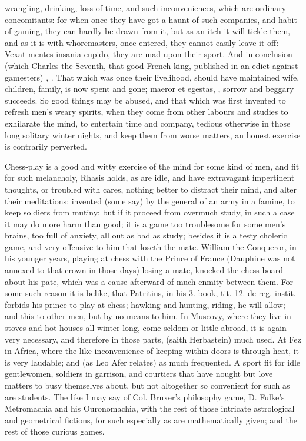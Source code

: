 {wrangling, drinking, loss of time, and such inconveniences, which are
ordinary concomitants: for when once they have got a haunt of
such companies, and habit of gaming, they can hardly be drawn from it,
but as an itch it will tickle them, and as it is with whoremasters,
once entered, they cannot easily leave it off: Vexat mentes insania
cupido, they are mad upon their sport. And in conclusion (which Charles
the Seventh, that good French king, published in an edict against
gamesters) , \etc{}. That which was once their livelihood, should have
maintained wife, children, family, is now spent and gone; maeror et
egestas, \etc{}, sorrow and beggary succeeds. So good things may be
abused, and that which was first invented to  refresh men's weary
spirits, when they come from other labours and studies to exhilarate
the mind, to entertain time and company, tedious otherwise in those
long solitary winter nights, and keep them from worse matters, an
honest exercise is contrarily perverted.

Chess-play is a good and witty exercise of the mind for some kind of
men, and fit for such melancholy, Rhasis holds, as are idle, and have
extravagant impertinent thoughts, or troubled with cares, nothing
better to distract their mind, and alter their meditations: invented
(some say) by the general of an army in a famine, to keep
soldiers from mutiny: but if it proceed from overmuch study, in such a
case it may do more harm than good; it is a game too troublesome for
some men's brains, too full of anxiety, all out as bad as study;
besides it is a testy choleric game, and very offensive to him that
loseth the mate. William the Conqueror, in his younger years,
playing at chess with the Prince of France (Dauphine was not annexed to
that crown in those days) losing a mate, knocked the chess-board about
his pate, which was a cause afterward of much enmity between them. For
some such reason it is belike, that Patritius, in his 3. book, tit. 12.
de reg. instit. forbids his prince to play at chess; hawking and
hunting, riding, \etc{} he will allow; and this to other men, but by no
means to him. In Muscovy, where they live in stoves and hot houses all
winter long, come seldom or little abroad, it is again very necessary,
and therefore in those parts, (saith Herbastein) much used. At
Fez in Africa, where the like inconvenience of keeping within doors is
through heat, it is very laudable; and (as Leo Afer relates) as
much frequented. A sport fit for idle gentlewomen, soldiers in
garrison, and courtiers that have nought but love matters to busy
themselves about, but not altogether so convenient for such as are
students. The like I may say of Col. Bruxer's philosophy game, D.
Fulke's Metromachia and his Ouronomachia, with the rest of those
intricate astrological and geometrical fictions, for such especially as
are mathematically given; and the rest of those curious games.

}

